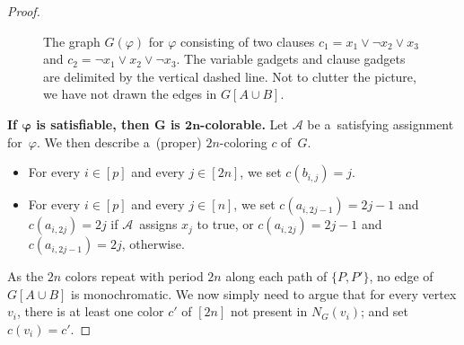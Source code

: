 \documentclass[a4paper,USenglish,cleveref,hyperref,autoref]{lipics-v2021}
\begin{document}
\begin{proof}
\begin{figure}[!ht]
\caption{The graph $G(\varphi)$ for $\varphi$ consisting of two clauses $c_1 = x_1 \lor \neg x_2 \lor x_3$ and $c_2 = \neg x_1 \lor x_2 \lor \neg x_3$.
  The variable gadgets and clause gadgets are delimited by the vertical dashed line.
  Not to clutter the picture, we have not drawn the edges in $G[A \cup B]$.}
\label{fig:col-hardness}
\end{figure}

  \medskip

  \textbf{If $\bm{\varphi}$ is satisfiable, then $\bm{G}$ is $\bm{2n}$-colorable.}
  Let $\mathcal A$ be a~satisfying assignment for~$\varphi$.
  We then describe a~(proper) $2n$-coloring $c$ of~$G$.
  \begin{itemize}
    \item For every $i \in [p]$ and every $j \in [2n]$, we set $c(b_{i,j})=j$.
    \item For every $i \in [p]$ and every $j \in [n]$, we set $c(a_{i,2j-1})=2j-1$ and $c(a_{i,2j})=2j$ if $\mathcal A$~assigns $x_j$ to true, or $c(a_{i,2j})=2j-1$ and $c(a_{i,2j-1})=2j$, otherwise.
  \end{itemize}
  \medskip
  As the $2n$ colors repeat with period $2n$ along each path of $\{P,P'\}$, no edge of $G[A \cup B]$ is monochromatic.
  We now simply need to argue that for every vertex $v_i$, there is at least one color $c'$ of $[2n]$ not present in $N_G(v_i)$; and set $c(v_i)=c'$.


\end{proof}
\end{document}
